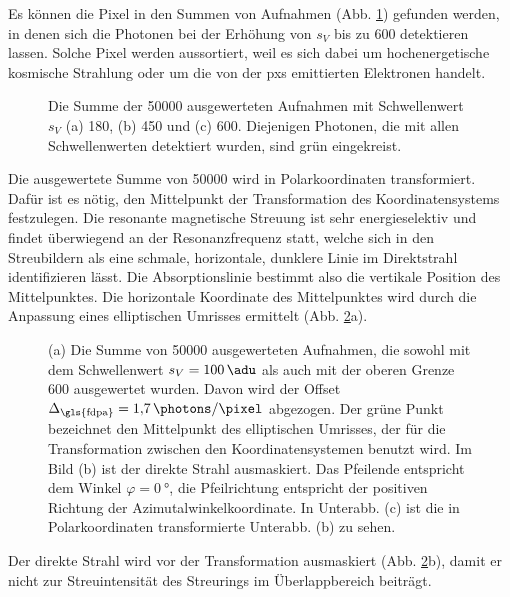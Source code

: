 \noindent
Es können die Pixel in den Summen von Aufnahmen (Abb. \ref{fig:th_180_450_600}) gefunden werden, in denen sich die Photonen bei der Erhöhung von $s_V$ bis zu \SI{600}{\adu} detektieren lassen. Solche Pixel werden aussortiert, weil es sich dabei um hochenergetische kosmische Strahlung oder um die von der \gls{pxs} emittierten Elektronen handelt.
\begin{figure}[H]
    \centering
    
    \caption{Die Summe der \num{50000} ausgewerteten Aufnahmen mit Schwellenwert $s_V$ (a) \SI{180}{\adu}, (b) \SI{450}{\adu} und (c) \SI{600}{\adu}. Diejenigen Photonen, die mit allen Schwellenwerten detektiert wurden, sind grün eingekreist.}
    \label{fig:th_180_450_600}
\end{figure}
\noindent
Die ausgewertete Summe von \SI{50000}{\captures} wird in Polarkoordinaten transformiert. Dafür ist es nötig, den Mittelpunkt der Transformation des Koordinatensystems festzulegen. Die resonante magnetische Streuung ist sehr energieselektiv und findet überwiegend an der Resonanzfrequenz statt, welche sich in den Streubildern als eine schmale, horizontale, dunklere Linie im Direktstrahl identifizieren lässt. Die Absorptionslinie bestimmt also die vertikale Position des Mittelpunktes. Die horizontale Koordinate des Mittelpunktes wird durch die Anpassung eines elliptischen Umrisses ermittelt (Abb. \ref{fig:th-100-200-maske-radial-transform}a).
\begin{figure}[H]
    \centering
    
    \caption{(a) Die Summe von \num{50000} ausgewerteten Aufnahmen, die sowohl mit dem Schwellenwert $s_V = \SI{100}{\adu}$ als auch mit der oberen Grenze \SI{600}{\adu} ausgewertet wurden. Davon wird der Offset $\Delta_\text{\gls{fdpa}} = \SI[per-mode = symbol]{1,7}{\photons\per\pixel}$ abgezogen. Der grüne Punkt bezeichnet den Mittelpunkt des elliptischen Umrisses, der für die Transformation zwischen den Koordinatensystemen benutzt wird. Im Bild (b) ist der direkte Strahl ausmaskiert. Das Pfeilende entspricht dem Winkel $\varphi = \SI{0}{\degree}$, die Pfeilrichtung entspricht der positiven Richtung der Azimutalwinkelkoordinate. In Unterabb. (c) ist die in Polarkoordinaten transformierte Unterabb. (b) zu sehen.}
    \label{fig:th-100-200-maske-radial-transform}
\end{figure}
\noindent
Der direkte Strahl wird vor der Transformation ausmaskiert (Abb. \ref{fig:th-100-200-maske-radial-transform}b), damit er nicht zur Streuintensität des Streurings im Überlappbereich beiträgt.

